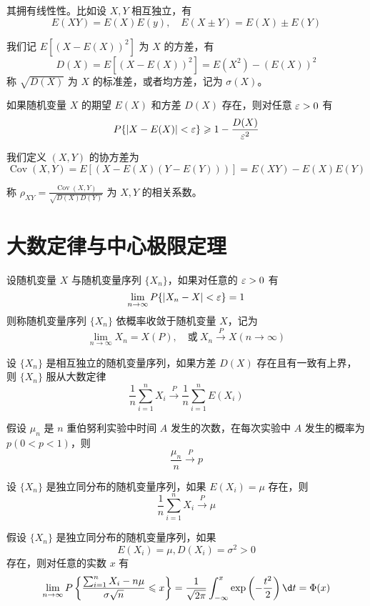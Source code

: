 其拥有线性性。比如设 $X, Y$ 相互独立，有
\[ E(X Y) = E(X) E(y), \quad E(X \pm Y) = E(X) \pm E(Y) \]

我们记 $E[(X - E(X))^2]$ 为 $X$ 的方差，有
\[ D(X) = E[(X - E(X))^2] = E(X^2) - (E(X))^2 \]
称 $\sqrt{D(X)}$ 为 $X$ 的标准差，或者均方差，记为 $\sigma(X)$。

\begin{theorem}[切比雪夫不等式]
	如果随机变量 $X$ 的期望 $E(X)$ 和方差 $D(X)$ 存在，则对任意 $\varepsilon > 0$ 有
	\[ P\{|X - E(X)| < \varepsilon\} \geqslant 1 - \frac{D(X)}{\varepsilon^2} \]
\end{theorem}

我们定义 $(X, Y)$ 的协方差为
\[ \operatorname{Cov}(X, Y) = E[(X - E(X)(Y - E(Y)))] = E(XY) - E(X) E(Y) \]

称 $\rho_{XY} = \frac{\operatorname{Cov}(X, Y)}{\sqrt{D(X) D(Y)}}$ 为 $X, Y$ 的相关系数。

\section{大数定律与中心极限定理}

设随机变量 $X$ 与随机变量序列 $\{X_n\}$，如果对任意的 $\varepsilon > 0$ 有
\[ \lim_{n \to \infty} P\{|X_n - X| < \varepsilon \} =1 \]
则称随机变量序列 $\{X_n\}$ 依概率收敛于随机变量 $X$，记为
\[ \lim_{n \to \infty} X_n = X(P), \quad \text{或}\ X_n \stackrel{P}{\longrightarrow} X(n \to \infty) \]

\begin{theorem}[切比雪夫大数定律]
	设 $\{X_n\}$ 是相互独立的随机变量序列，如果方差 $D(X)$ 存在且有一致有上界，则 $\{X_n\}$ 服从大数定律
	\[ \frac{1}{n} \sum_{i=1}^n X_i \stackrel{P}{\longrightarrow} \frac{1}{n} \sum_{i=1}^n E(X_i) \]
\end{theorem}

\begin{theorem}[伯努利大数定律]
	假设 $\mu_n$ 是 $n$ 重伯努利实验中时间 $A$ 发生的次数，在每次实验中 $A$ 发生的概率为 $p(0 < p < 1)$，则
	\[ \frac{\mu_n}{n} \stackrel{P}{\longrightarrow} p \]
\end{theorem}

\begin{theorem}[辛钦大数定律]
	设 $\{X_n\}$ 是独立同分布的随机变量序列，如果 $E(X_i) = \mu$ 存在，则
	\[ \frac{1}{n} \sum_{i=1}^n X_i \stackrel{P}{\longrightarrow} \mu \]
\end{theorem}

\begin{theorem}[列维 - 林德伯格定理]
	假设 $\{X_n\}$ 是独立同分布的随机变量序列，如果
	\[ E(X_i) = \mu, D(X_i) = \sigma^2 > 0 \]
	存在，则对任意的实数 $x$ 有
	\[ \lim_{n \to \infty} P\left\{ \frac{\sum_{i=1}^n X_i - n \mu}{\sigma \sqrt{n}} \leqslant x \right\} = \frac{1}{\sqrt{2 \pi}} \int_{-\infty}^x \exp\left(-\frac{t^2}{2}\right) \d t = \Phi(x)  \]
\end{theorem}

